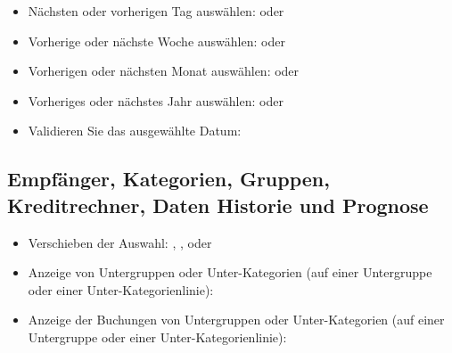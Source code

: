 \begin{itemize}
	\item Nächsten oder vorherigen Tag auswählen: \keys{{+}} oder \keys{{-}}
	\item Vorherige oder nächste Woche auswählen:  oder 
	\item Vorherigen oder nächsten Monat auswählen:  oder 
	\item Vorheriges oder nächstes Jahr auswählen:  oder 
	\item Validieren Sie das ausgewählte Datum: 
\end{itemize}


\subsection{Empfänger, Kategorien, Gruppen, Kreditrechner, Daten Historie und Prognose}

\begin{itemize}
	\item Verschieben der Auswahl: \keys{\arrowkeyup}, \keys{\arrowkeydown},  oder 
	\item Anzeige von Untergruppen oder Unter-Kategorien (auf einer Untergruppe oder einer Unter-Kategorienlinie): \keys{{+}}
	\item Anzeige der Buchungen von Untergruppen oder Unter-Kategorien (auf einer Untergruppe oder einer Unter-Kategorienlinie): 
\end{itemize}


